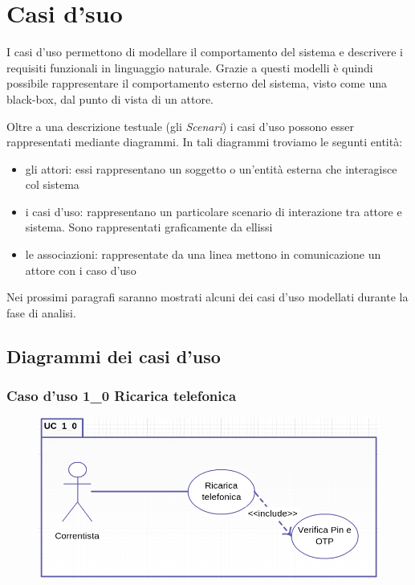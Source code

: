 \chapter{Casi d'suo}
I casi d'uso permettono di modellare il comportamento del sistema e descrivere i requisiti funzionali in linguaggio naturale. Grazie a questi modelli è quindi possibile rappresentare il comportamento esterno del sistema, visto come una black-box, dal punto di vista di un attore.

Oltre a una descrizione testuale (gli \emph{Scenari}) i casi d'uso possono esser rappresentati mediante diagrammi. In tali diagrammi troviamo le segunti entità:
 \begin{itemize}
  \item gli attori: essi rappresentano un soggetto o un'entità esterna che interagisce col sistema
  \item i casi d'uso: rappresentano un particolare scenario di interazione tra attore e sistema. Sono rappresentati graficamente da ellissi
  \item le associazioni: rappresentate da una linea mettono in comunicazione un attore con i caso d'uso
 \end{itemize}

 Nei prossimi paragrafi saranno mostrati alcuni dei casi d'uso modellati durante la fase di analisi.
 \section{Diagrammi dei casi d'uso}
 \subsection{Caso d'uso 1\_0 Ricarica telefonica}
	\begin{figure}[!htbp]
	  \centering
	  \includegraphics[scale=0.50]{casi_uso/ricarica.png}
	\end{figure}
 
